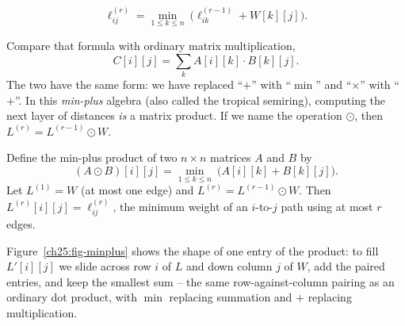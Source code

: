 \[
\ell^{(r)}_{ij} = \min_{1 \le k \le n}\ \big(\ell^{(r-1)}_{ik} + W[k][j]\big).
\]

Compare that formula with ordinary matrix multiplication,
\[
C[i][j] = \sum_{k} A[i][k] \cdot B[k][j].
\]
The two have the same form: we have
replaced ``$+$'' with ``$\min$'' and ``$\times$'' with ``$+$''. In this
\emph{min-plus} algebra (also called the tropical semiring), computing the
next layer of distances \emph{is} a matrix product. If we name the operation
$\odot$, then $L^{(r)} = L^{(r-1)} \odot W$.

\begin{formalbox}
Define the min-plus product of two $n \times n$ matrices $A$ and $B$ by
\[
(A \odot B)[i][j] = \min_{1 \le k \le n}\ \big(A[i][k] + B[k][j]\big).
\]
Let $L^{(1)} = W$ (at most one edge) and $L^{(r)} = L^{(r-1)} \odot W$. Then
$L^{(r)}[i][j] = \ell^{(r)}_{ij}$, the minimum weight of an $i$-to-$j$ path
using at most $r$ edges.
\end{formalbox}

Figure~\ref{ch25:fig-minplus} shows the shape of one entry of the product: to
fill $L'[i][j]$ we slide across row $i$ of $L$ and down column $j$ of $W$, add
the paired entries, and keep the smallest sum -- the same row-against-column
pairing as an ordinary dot product, with $\min$ replacing summation and $+$
replacing multiplication.

